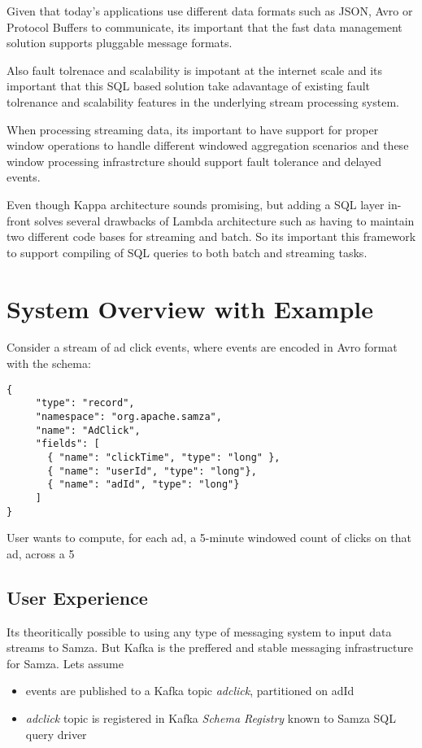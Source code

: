 \documentclass[10pt, conference, compsocconf]{IEEEtran}
\begin{document}
Given that today's applications use different data formats such as JSON, Avro or Protocol Buffers to communicate, its important that the fast data management solution supports pluggable message formats. 

Also fault tolrenace and scalability is impotant at the internet scale and its important that this SQL based solution take adavantage of existing fault tolrenance and scalability features in the underlying stream processing system. 

When processing streaming data, its important to have support for proper window operations to handle different windowed aggregation scenarios and these window processing infrastrcture should support fault tolerance and delayed events.

Even though Kappa architecture sounds promising, but adding a SQL layer in-front solves several drawbacks of Lambda architecture such as having to maintain two different code bases for streaming and batch. So its important this framework to support compiling of SQL queries to both batch and streaming tasks.

\section{System Overview with Example}
Consider a stream of ad click events, where events are encoded in Avro format with the schema:

\begin{lstlisting}
{
     "type": "record",
     "namespace": "org.apache.samza",
     "name": "AdClick",
     "fields": [
       { "name": "clickTime", "type": "long" },
       { "name": "userId", "type": "long"},
       { "name": "adId", "type": "long"}
     ]
}
\end{lstlisting}

User wants to compute, for each ad, a 5-minute windowed count of clicks on that ad, across a 5%

\subsection{User Experience}
Its theoritically possible to using any type of messaging system to input data streams to Samza. But Kafka is the preffered and stable messaging infrastructure for Samza. Lets assume 

\begin{itemize}
  \item events are published to a Kafka topic \textit{adclick}, partitioned on adId
  \item \textit{adclick} topic is registered in Kafka \textit{Schema Registry} known to Samza SQL query driver
\end{itemize}
\end{document}
